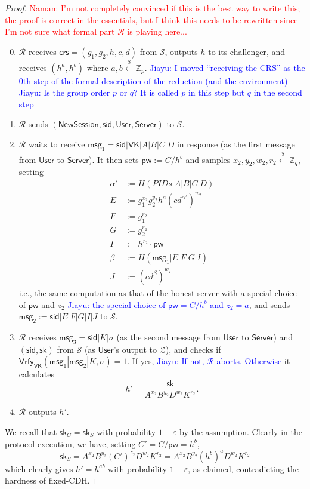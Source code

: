 \documentclass[12pt,a4paper]{article}
\newcommand{\simulator}{\mathcal{S}}
\newcommand{\env}{\mathcal{Z}}
\newcommand{\user}{\mathsf{User}}
\newcommand{\sk}{\mathsf{sk}}
\newcommand{\pw}{\mathsf{pw}}
\newcommand{\newsession}{\mathsf{NewSession}}
\newcommand{\server}{\mathsf{Server}}
\newcommand{\msg}[1]{\mathsf{msg}_{#1}}
\newcommand{\rgets}{\xleftarrow{\$}}
\def\xjy#1{\textcolor{blue}{Jiayu: #1}}
\def\nam#1{\textcolor{red}{Naman: #1}}
\begin{document}
\begin{proof}
	\nam{I'm not completely convinced if this is the best way to write this; the proof is correct in the essentials, but I think this needs to be rewritten since I'm not sure what formal part $\mathcal{R}$ is playing here...}
	
	\begin{enumerate}\setcounter{enumi}{-1}
        \item $\mathcal{R}$ receives $\mathsf{crs}=(g_1, g_2, h, c, d)$ from $\simulator$, outputs $h$ to its challenger, and receives $(h^a, h^b)$ where $a,b\rgets\mathbb{Z}_p$. \xjy{I moved ``receiving the CRS'' as the 0th step of the formal description of the reduction (and the environment)} \xjy{Is the group order $p$ or $q$? It is called $p$ in this step but $q$ in the second step}
		\item $\mathcal{R}$ sends $(\newsession,\mathsf{sid}, \user, \server)$ to $\simulator$.
		\item $\mathcal{R}$ waits to receive $\msg{1} = \mathsf{sid}|\mathsf{VK}|A|B|C|D$ in response (as the first message from $\user$ to $\server$). It then sets $\pw:=C/h^b$ and samples $x_2,y_2,w_2,r_2\rgets\mathbb{Z}_q$, setting
		\begin{align*}
			\alpha'&:=H(PIDs|A|B|C|D)\\
			E &:= g_1^{x_2}g_2^{y_2}h^{a}(cd^{\alpha'})^{w_2}\\
			F &:= g_1^{r_2}\\
			G &:= g_2^{r_2}\\
			I &:= h^{r_2}\cdot\pw\\
			\beta &:= H(\msg{1}|E|F|G|I)\\
			J &:= (cd^{\beta})^{w_2}
		\end{align*}
		i.e., the same computation as that of the honest server with a special choice of $\pw$ and $z_2$ \xjy{the special choice of $\pw = C/h^b$ and $z_2 = a$}, and sends $\msg{2}:=\mathsf{sid}|E|F|G|I|J$ to $\simulator$.
		\item $\mathcal{R}$ receives $\msg{3}=\mathsf{sid}|K|\sigma$ (as the second message from $\user$ to $\server$) and $(\mathsf{sid},\sk)$ from $\simulator$ (as $\user$'s output to $\env$), and checks if $\mathsf{Vrfy}_\mathsf{VK}(\msg{1}|\msg{2}|K,\sigma)=1$. If yes, \xjy{If not, $\mathcal{R}$ aborts. Otherwise} it calculates 
		$$h'=\frac{\sk}{A^{x_2}B^{y_2}D^{w_2}K^{r_2}}.$$
		\item $\mathcal{R}$ outputs $h'$.		
	\end{enumerate}

		We recall that $\sk_C=\sk_S$ with probability $1-\varepsilon$ by the assumption. Clearly in the protocol execution, we have, setting $C'=C/\pw=h^b$,
		$$\sk_S = A^{x_2}B^{y_2}(C')^{z_2}D^{w_2}K^{r_2}=A^{x_2}B^{y_2}(h^b)^{a}D^{w_2}K^{r_2}$$ which clearly gives $h' = h^{ab}$ with probability $1-\varepsilon$, as claimed, contradicting the hardness of fixed-CDH.


\end{proof}
\end{document}
